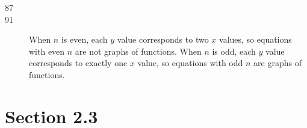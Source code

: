 \documentclass{exam}
\begin{document}
\begin{description}
    \item[87]

    \item[91]
      When $n$ is even, each $y$ value corresponds to two $x$ values, so
      equations with even $n$ are not graphs of functions.  When $n$ is odd,
      each $y$ value corresponds to exactly one $x$ value, so equations with odd
      $n$ are graphs of functions.

  \end{description}

  \pagebreak

  \section{Section 2.3}
\end{document}
